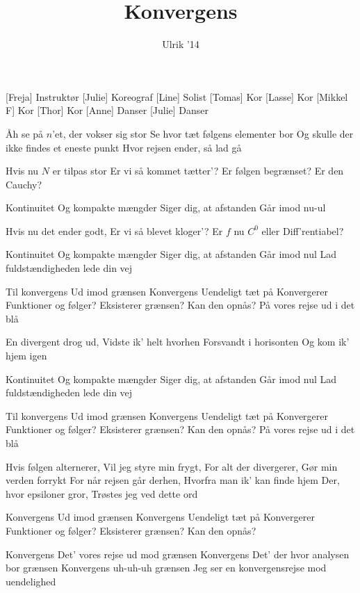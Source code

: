 \documentclass[a4paper,11pt]{article}
\title{Konvergens}
\author{Ulrik '14}
\begin{document}
\maketitle

\begin{roles}
[Freja] Instruktør
[Julie] Koreograf
[Line] Solist
[Tomas] Kor
[Lasse] Kor
[Mikkel F] Kor
[Thor] Kor
[Anne] Danser
[Julie] Danser
\end{roles}

\begin{song}
 Åh se på $n$’et, der vokser sig stor
Se hvor tæt følgens elementer bor
Og skulle der ikke findes et eneste punkt
Hvor rejsen ender, så lad gå

 Hvis nu $N$ er tilpas stor
Er vi så kommet tætter’?
Er følgen begrænset?
Er den Cauchy?

 Kontinuitet
Og kompakte mængder
Siger dig, at afstanden
Går imod nu-ul

 Hvis nu det ender godt,
Er vi så blevet kloger’?
Er $f$ nu $C^0$ eller
Diff’rentiabel? %

 Kontinuitet
Og kompakte mængder
Siger dig, at afstanden
Går imod nul
Lad fuldstændigheden lede din vej

 Til konvergens
Ud imod grænsen
Konvergens
Uendeligt tæt på
Konvergerer
Funktioner og følger?
Eksisterer grænsen?
Kan den opnås?
På vores rejse ud i det blå

 En divergent drog ud,
Vidste ik' helt hvorhen
Forsvandt i horisonten
Og kom ik' hjem igen

 Kontinuitet
Og kompakte mængder
Siger dig, at afstanden
Går imod nul
Lad fuldstændigheden lede din vej

 Til konvergens
Ud imod grænsen
Konvergens
Uendeligt tæt på
Konvergerer
Funktioner og følger?
Eksisterer grænsen?
Kan den opnås?
På vores rejse ud i det blå

 Hvis følgen alternerer,
Vil jeg styre min frygt,
For alt der divergerer,
Gør min verden forrykt
For når rejsen går derhen,
Hvorfra man ik’ kan finde hjem
Der, hvor epsiloner gror,
Trøstes jeg ved dette ord

 Konvergens
Ud imod grænsen
Konvergens
Uendeligt tæt på
Konvergerer
Funktioner og følger?
Eksisterer grænsen?
Kan den opnås?

 Konvergens 
 Det’ vores rejse ud mod 
 grænsen
 Konvergens 
 Det’ der hvor analysen bor 
 grænsen
 Konvergens uh-uh-uh
 grænsen
 Jeg ser en konvergensrejse mod uendelighed 

\end{song}
\end{document}
